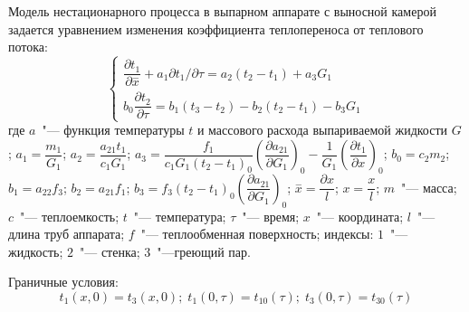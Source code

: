 Модель нестационарного процесса в выпарном аппарате с выносной камерой \cite{Ponomarenko.Mathematical.1977} задается уравнением изменения коэффициента теплопереноса от
теплового потока:
\begin{equation}
 \left\{\begin{array}{c}\dfrac{\partial {t}_{1}}{\partial \stackrel{-}{x}}+{a}_{1}{\partial {t}_{1}}/{\partial \tau }={a}_{2}\left({t}_{2}-{t}_{1}\right)+{a}_{3}{G}_{1}\\ {b}_{0}\dfrac{\partial {t}_{2}}{\partial \tau }={b}_{1}\left({t}_{3}-{t}_{2}\right)-{b}_{2}\left({t}_{2}-{t}_{1}\right)-{b}_{3}{G}_{1}\end{array}\right. \end{equation}
где \(a\)~"--- функция температуры \(t\) и массового расхода выпариваемой жидкости \(G\); \({a}_{1}=\dfrac{{m}_{1}}{{G}_{1}}\); \({a}_{2}=\dfrac{{a}_{21}{t}_{1}}{{c}_{1}{G}_{1}} \); \({a}_{3}=\dfrac{{f}_{1}}{{c}_{1}{G}_{1}{\left({t}_{2}-{t}_{1} \right)}_{0}} {\left(\dfrac{\partial {a}_{21}}{\partial {G}_{1}}\right)}_{0}-\dfrac{1}{{G}_{1}}{\left(\dfrac{\partial {t}_{1}}{\partial \stackrel{~}{x}}\right)}_{0} \); \({b}_{0}={c}_{2}{m}_{2}\); \( {b}_{1}={a}_{22}{f}_{3} \); \( {b}_{2}={a}_{21}{f}_{1} \); \( {b}_{3}={f}_{3}{\left({t}_{2}-{t}_{1}\right)}_{0}{\left(\dfrac{\partial {a}_{21}}{\partial {G}_{1}}\right)}_{0} \); \( \stackrel{-}{x}=\dfrac{\partial x}{l} \); \( \stackrel{~}{x}=\dfrac{x}{l} \); \(m\)~"--- масса; \(c\)~"---
теплоемкость; \(t\)~"--- температура; \(\tau\)~"--- время; \(x\)~"--- координата; \(l\)~"--- длина труб аппарата; \(f\)~"--- теплообменная поверхность;
индексы: \(1\)~"--- жидкость; \(2\)~"--- стенка; \(3\)~"---греющий пар.
 
Граничные условия:
\begin{equation}
 {t}_{1}\left(x, 0\right)={t}_{3}\left(x, 0\right);\;  {t}_{1}\left(0, \tau \right)={t}_{10}\left(\tau \right);\;  {t}_{3}\left(0, \tau \right)={t}_{30}\left(\tau \right)  
\end{equation}

